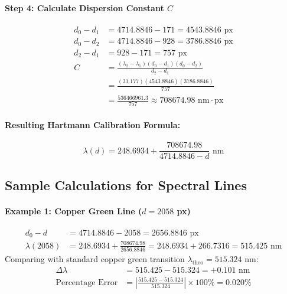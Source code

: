 \documentclass[12pt, a4paper]{article}
\begin{document}
\paragraph{Step 4: Calculate Dispersion Constant $C$}
\begin{align*}
    d_0 - d_1 &= 4714.8846 - 171 = 4543.8846\text{ px} \\
    d_0 - d_2 &= 4714.8846 - 928 = 3786.8846\text{ px} \\
    d_2 - d_1 &= 928 - 171 = 757\text{ px} \\[1.5ex]
    C &= \frac{(\lambda_2 - \lambda_1)(d_0 - d_1)(d_0 - d_2)}{d_2 - d_1} \\[1.5ex]
    &= \frac{(31.177)(4543.8846)(3786.8846)}{757} \\[1.5ex]
    &= \frac{536466961.3}{757} \approx 708674.98\text{ nm}\cdot\text{px}
\end{align*}

\paragraph{Resulting Hartmann Calibration Formula:}
\begin{equation}
    \lambda(d) = 248.6934 + \frac{708674.98}{4714.8846 - d}\text{ nm}
    \label{eq:calibrated_hartmann}
\end{equation}

\subsection{Sample Calculations for Spectral Lines}

\paragraph{Example 1: Copper Green Line ($d = 2058$ px)}
\begin{align*}
    d_0 - d &= 4714.8846 - 2058 = 2656.8846\text{ px} \\
    \lambda(2058) &= 248.6934 + \frac{708674.98}{2656.8846} = 248.6934 + 266.7316 = 515.425\text{ nm}
\end{align*}
Comparing with standard copper green transition $\lambda_{\text{theo}} = 515.324$ nm:
\begin{align*}
    \Delta \lambda &= 515.425 - 515.324 = +0.101\text{ nm} \\
    \text{Percentage Error} &= \left| \frac{515.425 - 515.324}{515.324} \right| \times 100\% = 0.020\%
\end{align*}
\end{document}

